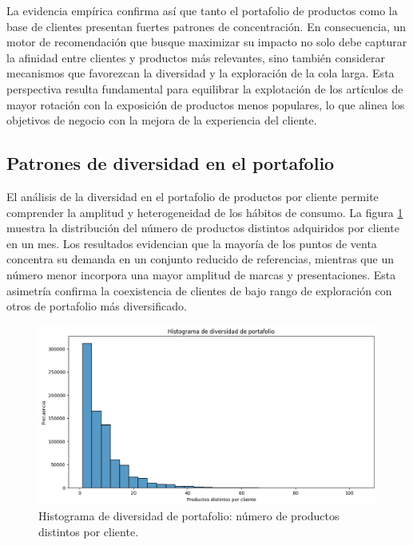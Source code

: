 La evidencia empírica confirma así que tanto el portafolio de productos como la base de clientes presentan fuertes patrones de concentración. En consecuencia, un motor de recomendación que busque maximizar su impacto no solo debe capturar la afinidad entre clientes y productos más relevantes, sino también considerar mecanismos que favorezcan la diversidad y la exploración de la cola larga. Esta perspectiva resulta fundamental para equilibrar la explotación de los artículos de mayor rotación con la exposición de productos menos populares, lo que alinea los objetivos de negocio con la mejora de la experiencia del cliente.

\subsection{Patrones de diversidad en el portafolio}

El análisis de la diversidad en el portafolio de productos por cliente permite comprender la amplitud y heterogeneidad de los hábitos de consumo. La figura \ref{fig:hist_diversidad} muestra la distribución del número de productos distintos adquiridos por cliente en un mes. Los resultados evidencian que la mayoría de los puntos de venta concentra su demanda en un conjunto reducido de referencias, mientras que un número menor incorpora una mayor amplitud de marcas y presentaciones. Esta asimetría confirma la coexistencia de clientes de bajo rango de exploración con otros de portafolio más diversificado.

\begin{figure}[htpb]
	\centering
	\includegraphics[scale=.55]{./Figures/hist_diversidad.png}
	\caption{Histograma de diversidad de portafolio: número de productos distintos por cliente.}
	\label{fig:hist_diversidad}
\end{figure}

